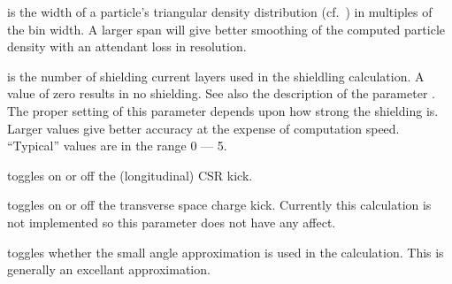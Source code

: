  is the width of a particle's triangular density
distribution (cf.~) in multiples of the bin width. A
larger span will give better smoothing of the computed particle
density with an attendant loss in resolution.

 is the number of shielding current layers used in
the shieldling calculation. A value of zero results in no
shielding. See also the description of the parameter
. The proper setting of this parameter depends
upon how strong the shielding is. Larger values give better accuracy
at the expense of computation speed. ``Typical'' values are in the
range 0 --- 5.

 toggles on or off the (longitudinal) CSR kick.

 toggles on or off the transverse space charge
kick. Currently this calculation is not implemented so this parameter
does not have any affect.

 toggles whether the small angle approximation
is used in the calculation. This is generally an excellant
approximation.


